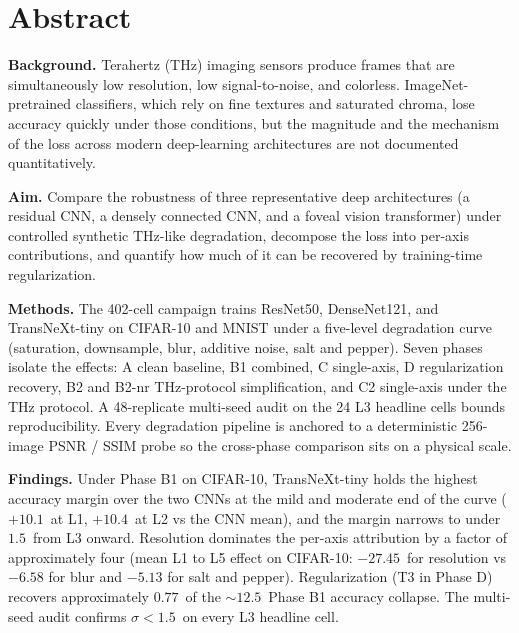 \section*{Abstract}

\noindent\textbf{Background.}\quad
Terahertz (THz) imaging sensors produce frames that are simultaneously low
resolution, low signal-to-noise, and colorless. ImageNet-pretrained
classifiers, which rely on fine textures and saturated chroma, lose
accuracy quickly under those conditions, but the magnitude and the
mechanism of the loss across modern deep-learning architectures are not
documented quantitatively.

\noindent\textbf{Aim.}\quad
Compare the robustness of three representative deep architectures (a
residual CNN, a densely connected CNN, and a foveal vision transformer)
under controlled synthetic THz-like degradation, decompose the loss into
per-axis contributions, and quantify how much of it can be recovered by
training-time regularization.

\noindent\textbf{Methods.}\quad
The 402-cell campaign trains ResNet50, DenseNet121, and TransNeXt-tiny
on CIFAR-10 and MNIST under a five-level degradation curve (saturation,
downsample, blur, additive noise, salt and pepper). Seven phases isolate
the effects: A clean baseline, B1 combined, C single-axis, D
regularization recovery, B2 and B2-nr THz-protocol simplification, and
C2 single-axis under the THz protocol. A 48-replicate multi-seed audit
on the 24 L3 headline cells bounds reproducibility. Every degradation
pipeline is anchored to a deterministic 256-image PSNR / SSIM probe so
the cross-phase comparison sits on a physical scale.

\noindent\textbf{Findings.}\quad
Under Phase B1 on CIFAR-10, TransNeXt-tiny holds the highest accuracy
margin over the two CNNs at the mild and moderate end of the curve
($+10.1\,$\Mpp{} at L1, $+10.4\,$\Mpp{} at L2 vs the CNN mean), and the
margin narrows to under $1.5\,$\Mpp{} from L3 onward. Resolution
dominates the per-axis attribution by a factor of approximately four
(mean L1 to L5 effect on CIFAR-10: $-27.45\,$\Mpp{} for resolution vs
$-6.58$ for blur and $-5.13$ for salt and pepper). Regularization (T3 in
Phase D) recovers approximately $0.77\,$\Mpp{} of the $\sim 12.5\,$\Mpp{}
Phase B1 accuracy collapse. The multi-seed audit confirms
$\sigma < 1.5\,$\Mpp{} on every L3 headline cell.

